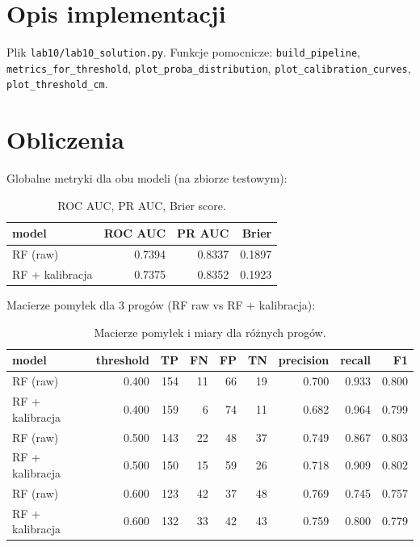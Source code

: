 \documentclass[12pt,a4paper]{article}
\begin{document}
\section{Opis implementacji}
Plik \texttt{lab10/lab10\_solution.py}. Funkcje pomocnicze: \texttt{build\_pipeline}, \texttt{metrics\_for\_threshold}, \texttt{plot\_proba\_distribution}, \texttt{plot\_calibration\_curves}, \texttt{plot\_threshold\_cm}.

\section{Obliczenia}
Globalne metryki dla obu modeli (na zbiorze testowym):

\begin{table}[H]
\centering
\begin{tabular}{lrrr}
\toprule
model & ROC AUC & PR AUC & Brier \\
\midrule
RF (raw) & 0.7394 & 0.8337 & 0.1897 \\
RF + kalibracja & 0.7375 & 0.8352 & 0.1923 \\
\bottomrule
\end{tabular}

\caption{ROC AUC, PR AUC, Brier score.}
\label{tab:global}
\end{table}

Macierze pomyłek dla 3 progów (RF raw vs RF + kalibracja):

\begin{table}[H]
\centering
\begin{tabular}{lrrrrrrrr}
\toprule
model & threshold & TP & FN & FP & TN & precision & recall & F1 \\
\midrule
RF (raw) & 0.400 & 154 & 11 & 66 & 19 & 0.700 & 0.933 & 0.800 \\
RF + kalibracja & 0.400 & 159 & 6 & 74 & 11 & 0.682 & 0.964 & 0.799 \\
RF (raw) & 0.500 & 143 & 22 & 48 & 37 & 0.749 & 0.867 & 0.803 \\
RF + kalibracja & 0.500 & 150 & 15 & 59 & 26 & 0.718 & 0.909 & 0.802 \\
RF (raw) & 0.600 & 123 & 42 & 37 & 48 & 0.769 & 0.745 & 0.757 \\
RF + kalibracja & 0.600 & 132 & 33 & 42 & 43 & 0.759 & 0.800 & 0.779 \\
\bottomrule
\end{tabular}

\caption{Macierze pomyłek i miary dla różnych progów.}
\label{tab:cm}
\end{table}
\end{document}
